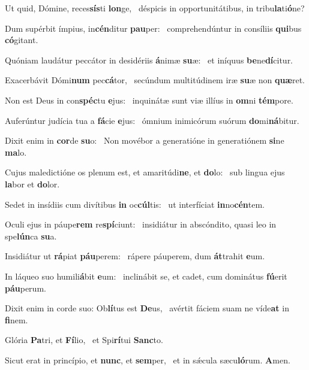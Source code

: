 \item Ut quid, Dómine, reces\textbf{sís}ti \textbf{lon}ge,~\psstar{} déspicis in opportunitátibus, in tribu\textbf{la}ti\textbf{ó}ne?
\item Dum supérbit ímpius, in\textbf{cén}ditur \textbf{pau}per:~\psstar{} comprehendúntur in consíliis \textbf{qui}bus \textbf{có}gitant.
\item Quóniam laudátur peccátor in desidériis \textbf{á}nimæ \textbf{su}æ:~\psstar{} et iníquus \textbf{be}ne\textbf{dí}citur.
\item Exacerbávit Dómi\textbf{num} pec\textbf{cá}tor,~\psstar{} secúndum multitúdinem iræ \textbf{su}æ non \textbf{quæ}ret.
\item Non est Deus in con\textbf{spéc}tu \textbf{e}jus:~\psstar{} inquinátæ sunt viæ illíus in \textbf{om}ni \textbf{tém}pore.
\item Auferúntur judícia tua a \textbf{fá}cie \textbf{e}jus:~\psstar{} ómnium inimicórum suórum \textbf{do}mi\textbf{ná}bitur.
\item Dixit enim in \textbf{cor}de \textbf{su}o:~\psstar{} Non movébor a generatióne in generatiónem \textbf{si}ne \textbf{ma}lo.
\item Cujus maledictióne os plenum est, et amaritúdi\textbf{ne}, et \textbf{do}lo:~\psstar{} sub lingua ejus \textbf{la}bor et \textbf{do}lor.
\item Sedet in insídiis cum divítibus \textbf{in} oc\textbf{cúl}tis:~\psstar{} ut interfíciat \textbf{in}no\textbf{cén}tem.
\item Oculi ejus in páupe\textbf{rem} re\textbf{spí}ciunt:~\psstar{} insidiátur in abscóndito, quasi leo in spe\textbf{lún}ca \textbf{su}a.
\item Insidiátur ut \textbf{rá}piat \textbf{páu}perem:~\psstar{} rápere páuperem, dum \textbf{át}trahit \textbf{e}um.
\item In láqueo suo humili\textbf{á}bit \textbf{e}um:~\psstar{} inclinábit se, et cadet, cum dominátus \textbf{fú}erit \textbf{páu}perum.
\item Dixit enim in corde suo: Ob\textbf{lí}tus est \textbf{De}us,~\psstar{} avértit fáciem suam ne víde\textbf{at} in \textbf{fi}nem.
\item Glória \textbf{Pa}tri, et \textbf{Fí}lio,~\psstar{} et Spi\textbf{rí}tui \textbf{Sanc}to.
\item Sicut erat in princípio, et \textbf{nunc}, et \textbf{sem}per,~\psstar{} et in sǽcula sæcu\textbf{ló}rum. \textbf{A}men.
